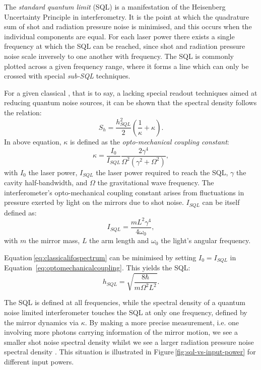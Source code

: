 The \emph{standard quantum limit} (\gls{SQL}) is a manifestation of the Heisenberg Uncertainty Principle in interferometry. It is the point at which the quadrature sum of shot and radiation pressure noise is minimised, and this occurs when the individual components are equal. For each laser power there exists a single frequency at which the \gls{SQL} can be reached, since shot and radiation pressure noise scale inversely to one another with frequency. The \gls{SQL} is commonly plotted across a given frequency range, where it forms a line which can only be crossed with special \emph{sub-\gls{SQL}} techniques.

For a given classical \MI{}, that is to say, a \MI{} lacking special readout techniques aimed at reducing quantum noise sources, it can be shown \cite{Braginsky1996} that the spectral density follows the relation:
\begin{equation}
  \label{eq:classicalifospectrum}
  S_h = \frac{h^{2}_{SQL}}{2} \left( \frac{1}{\kappa} + \kappa \right).
\end{equation}
In above equation, $\kappa$ is defined as the \emph{opto-mechanical coupling constant}:
\begin{equation}
 \kappa = \frac{I_0}{I_{SQL}} \frac{2 \gamma^4}{\Omega^2 \left( \gamma^2 +
\Omega^2 \right)},
 \label{eq:optomechanicalcoupling}
\end{equation}
with $I_0$ the laser power, $I_{SQL}$ the laser power required to reach the \gls{SQL}, $\gamma$ the cavity half-bandwidth, and $\Omega$ the gravitational wave frequency. The interferometer's opto-mechanical coupling constant arises from fluctuations in pressure exerted by light on the mirrors due to shot noise. $I_{SQL}$ can be itself defined as:
\begin{equation}
 I_{SQL} = \frac{m L^2 \gamma^4}{4 \omega_0},
\end{equation}
with $m$ the mirror mass, $L$ the arm length and $\omega_0$ the light's angular frequency.

Equation\,\ref{eq:classicalifospectrum} can be minimised by setting $I_0 = I_{SQL}$ in Equation~\ref{eq:optomechanicalcoupling}. This yields the \gls{SQL}:
\begin{equation}
  \label{eq:strainsql}
  h_{SQL} = \sqrt{\frac{8 \hbar}{m \Omega^2 L^2}}.
\end{equation}

The \gls{SQL} is defined at all frequencies, while the spectral density of a quantum noise limited interferometer touches the \gls{SQL} at only one frequency, defined by the mirror dynamics via $\kappa$. By making a more precise measurement, i.e. one involving more photons carrying information of the mirror motion, we see a smaller shot noise spectral density whilst we see a larger radiation pressure noise spectral density \cite{Caves1981}. This situation is illustrated in Figure\,\ref{fig:sql-vs-input-power} for different input powers.

